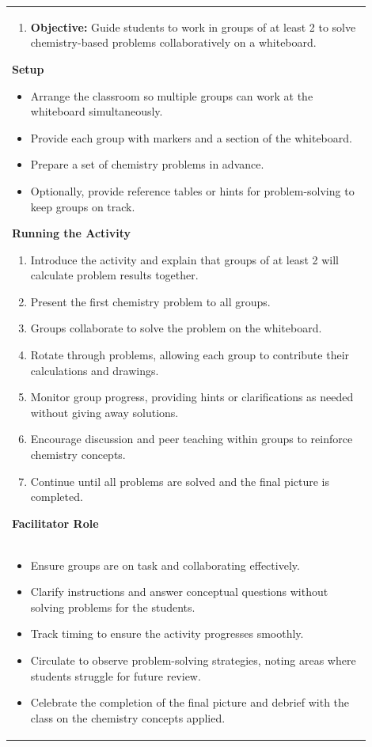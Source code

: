 \documentclass{article}
\begin{document}
\begin{tabular}{|p{0.9\linewidth}|}
\hline
\begin{enumerate}
\item\textbf{Objective:}
Guide students to work in groups of at least 2 to solve chemistry-based problems collaboratively on a whiteboard.
\end{enumerate}

\hline  
\textbf{Setup}  
\begin{itemize}  
   \item Arrange the classroom so multiple groups can work at the whiteboard simultaneously.  
   \item Provide each group with markers and a section of the whiteboard.  
   \item Prepare a set of chemistry problems in advance.  
   \item Optionally, provide reference tables or hints for problem-solving to keep groups on track.  
\end{itemize}  

\textbf{Running the Activity}  
\begin{enumerate}  
   \item Introduce the activity and explain that groups of at least 2 will calculate problem results together.  
   \item Present the first chemistry problem to all groups.  
   \item Groups collaborate to solve the problem on the whiteboard.  
   \item Rotate through problems, allowing each group to contribute their calculations and drawings.  
   \item Monitor group progress, providing hints or clarifications as needed without giving away solutions.  
   \item Encourage discussion and peer teaching within groups to reinforce chemistry concepts.  
   \item Continue until all problems are solved and the final picture is completed.  
\end{enumerate}  

\textbf{Facilitator Role} \\  
\begin{itemize}  
   \item Ensure groups are on task and collaborating effectively.  
   \item Clarify instructions and answer conceptual questions without solving problems for the students.  
   \item Track timing to ensure the activity progresses smoothly.  
   \item Circulate to observe problem-solving strategies, noting areas where students struggle for future review.  
   \item Celebrate the completion of the final picture and debrief with the class on the chemistry concepts applied.  
\end{itemize}  
\\ \hline  
\end{tabular}  
\end{document}
